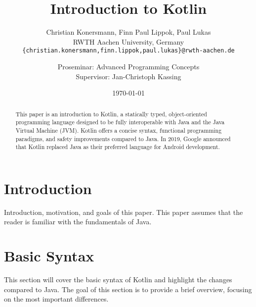 \documentclass[a4paper, 11pt]{article}
\title{\huge \bfseries Introduction to Kotlin}
\author{
  Christian Konersmann, Finn Paul Lippok, Paul Lukas \\[1ex]
  RWTH Aachen University, Germany \\
  \texttt{\{christian.konersmann,finn.lippok,paul.lukas\}@rwth-aachen.de}\\
  \and
  Proseminar: Advanced Programming Concepts \\
  Supervisor: Jan-Christoph Kassing
}
\date{\today}
\begin{document}
\maketitle

\begin{abstract}
  This paper is an introduction to Kotlin, a statically typed, object-oriented programming language designed to be fully interoperable with Java and the Java Virtual Machine (JVM).
  Kotlin offers a concise syntax, functional programming paradigms, and safety improvements compared to Java. In 2019, Google announced that Kotlin replaced Java as their preferred language for Android development.
\end{abstract}

\section{Introduction}
  Introduction, motivation, and goals of this paper.
  This paper assumes that the reader is familiar with the fundamentals of Java.
\section{Basic Syntax}
  This section will cover the basic syntax of Kotlin and highlight the changes compared to Java.
  The goal of this section is to provide a brief overview, focusing on the most important differences.
\end{document}
